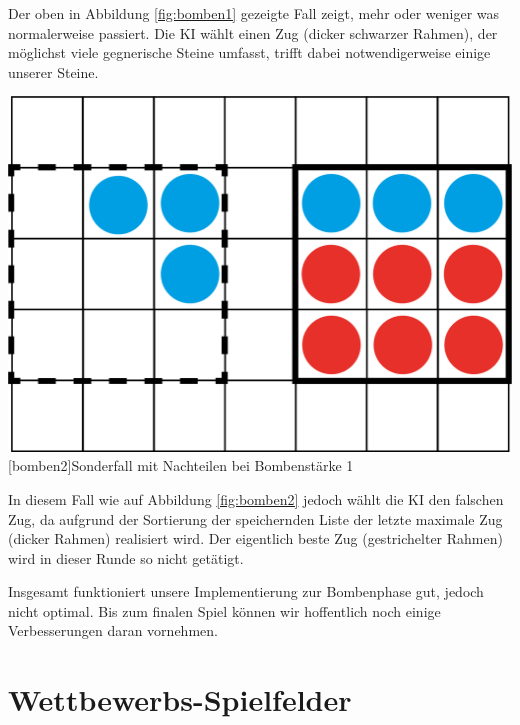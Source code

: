 \documentclass[12pt,a4paper,bibliography=totocnumbered,listof=totocnumbered]{scrartcl}
\begin{document}
	Der oben in Abbildung \ref{fig:bomben1} gezeigte Fall zeigt, mehr oder weniger was normalerweise passiert. Die KI wählt einen Zug (dicker schwarzer Rahmen), der möglichst viele gegnerische Steine umfasst, trifft dabei notwendigerweise einige unserer Steine.

	
	\vspace{1em}
	\begin{minipage}{\linewidth}
		\centering
		\includegraphics[width=0.6\linewidth]{pics/Kapitel_5/Kapitel_5_pic2.png}
		[bomben2]{Sonderfall mit Nachteilen bei Bombenstärke 1}
		\label{fig:bomben2}
	\end{minipage}
	\vspace{1em}
	
	In diesem Fall wie auf Abbildung \ref{fig:bomben2} jedoch wählt die KI den falschen Zug, da aufgrund der Sortierung der speichernden Liste der letzte maximale Zug (dicker Rahmen) realisiert wird. Der eigentlich beste Zug (gestrichelter Rahmen) wird in dieser Runde so nicht getätigt.
	
	Insgesamt funktioniert unsere Implementierung zur Bombenphase gut, jedoch nicht optimal. Bis zum finalen Spiel können wir hoffentlich noch einige Verbesserungen daran vornehmen.

    
    \section{Wettbewerbs-Spielfelder}
    \vspace{1em}
\end{document}
